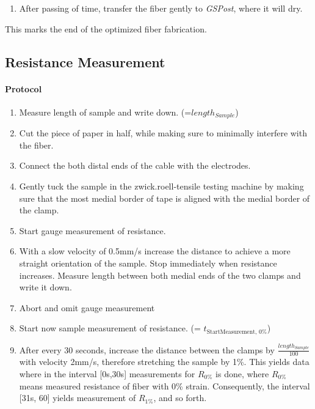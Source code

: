 \begin{appendices}
\begin{enumerate}
	\item After passing of time, transfer the fiber gently to \textit{GSPost}, where it will dry.
\end{enumerate}

\begin{center}
	This marks the end of the optimized fiber fabrication.
\end{center}

\subsection{Resistance Measurement}

\paragraph{Protocol}
\label{App:ResMeas} \hfill\newline


\begin{enumerate}
	\item Measure length of sample and write down. (=$length_{Sample}$)
	
	\item Cut the piece of paper in half, while making sure to minimally interfere with the fiber.
	
	\item Connect the both distal ends of the cable with the electrodes.
	
	\item Gently tuck the sample in the zwick.roell-tensile testing machine by making sure that the most medial border of tape is aligned with the medial border of the clamp. 
	
	\item Start gauge measurement of resistance.	
	
	\item With a slow velocity of 0.5mm/s increase the distance to achieve a more straight orientation of the sample. Stop immediately when resistance increases. Measure length between both medial ends of the two clamps and write it down.
	
	\item Abort and omit gauge measurement 
	
	\item Start now sample measurement of resistance. (= $t_{\text{StartMeasurement, 0\%}}$)
	
	\item After every 30 seconds, increase the distance between the clamps by $\frac{length_{Sample}}{100}$ with velocity 2mm/s, therefore stretching the sample by 1\%. This yields data where in the interval [0s,30s] measurements for $R_{0\%}$ is done, where $R_{0\%}$ means measured resistance of fiber with 0\% strain. Consequently, the interval [31s, 60] yields measurement of $R_{1\%}$, and so forth.
	

\end{enumerate}
\end{appendices}

